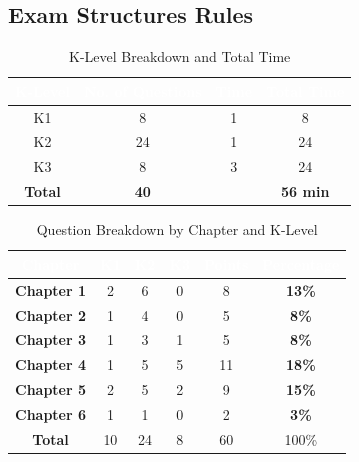 \documentclass{article}
\begin{document}
\begin{multicols}{3}
{\section*{Exam Structures Rules}
\vspace{-10pt}
\begin{table}[H]
\renewcommand{\arraystretch}{2}
\centering
\begin{tabular}{|c|c|c|c|}
\hline
\rowcolor{black} \textcolor{white}{\textbf{K-Level}} & 
\textcolor{white}{\textbf{No. of Questions}} & 
\textcolor{white}{\textbf{Time}} & 
\textcolor{white}{\textbf{Total Time}} \\ \hline
K1                              & 8                                              & 1                                    & 8                       \\ \hline
K2                              & 24                                             & 1                                    & 24                      \\ \hline
K3                              & 8                                              & 3                                    & 24                      \\ \hline
\hline
\textbf{Total}                 & \textbf{40}                                    &                               & \textbf{56 min}             \\ \hline
\end{tabular}
\caption*{K-Level Breakdown and Total Time}
\end{table}

\begin{table}[H] 
\renewcommand{\arraystretch}{2}
\centering
\begin{tabular}{|c|c|c|c|c|c|}
\hline
\cellcolor{black}\textcolor{white}{\textbf{Chapter}} & \cellcolor{black}\textcolor{white}{\textbf{K1}} & \cellcolor{black}\textcolor{white}{\textbf{K2}} & \cellcolor{black}\textcolor{white}{\textbf{K3}} & \cellcolor{black}\textcolor{white}{\textbf{Points}} & \cellcolor{black}\textcolor{white}{\textbf{Percentage}} \\ \hline
\textbf{Chapter 1} & 2 & 6 & 0 & 8 & \textbf{13\%} \\ \hline
\textbf{Chapter 2} & 1 & 4 & 0 & 5 & \textbf{8\%} \\ \hline
\textbf{Chapter 3} & 1 & 3 & 1 & 5 & \textbf{8\%} \\ \hline
\textbf{Chapter 4} & 1 & 5 & 5 & 11 & \textbf{18\%} \\ \hline
\textbf{Chapter 5} & 2 & 5 & 2 & 9 & \textbf{15\%} \\ \hline
\textbf{Chapter 6} & 1 & 1 & 0 & 2 & \textbf{3\%} \\ \hline \hline
\textbf{Total} & 10 & 24 & 8 & 60 & 100\% \\ \hline
\end{tabular} 
\caption*{Question Breakdown by Chapter and K-Level}
\end{table}
}


\end{multicols}
\end{document}
